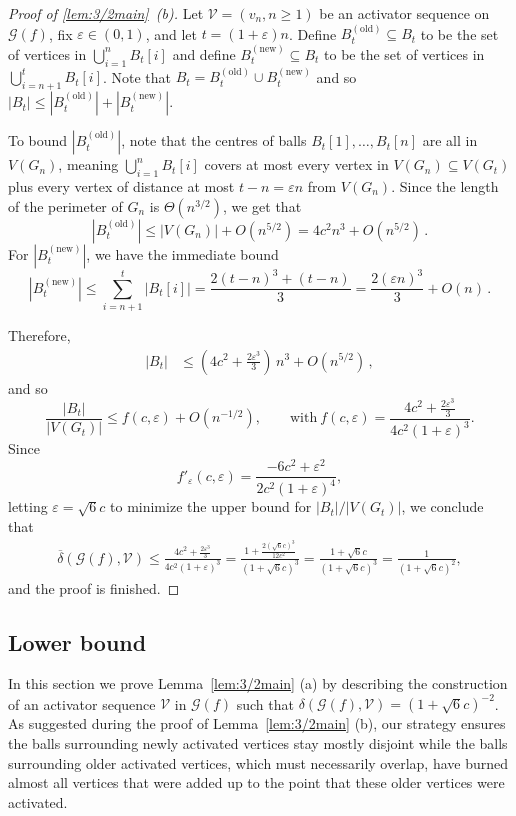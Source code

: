 \documentclass[12pt]{article}
\theoremstyle{remark}
\newcommand\cG{\mathcal G}
\newcommand\cV{\mathcal V}
\begin{document}
\begin{proof}[Proof of \cref{lem:3/2main}~(b)]
Let $\cV = (v_n, n \geq 1)$ be an activator sequence on $\cG(f)$, fix $\varepsilon \in (0,1)$, and let $t = (1+\varepsilon)n$. Define $B_t^{(\text{old})} \subseteq B_t$ to be the set of vertices in $\bigcup_{i=1}^n B_t[i]$ and define $B_t^{(\text{new})} \subseteq B_t$ to be the set of vertices in $\bigcup_{i=n+1}^t B_t[i]$. Note that $B_t = B_t^{(\text{old})} \cup B_t^{(\text{new})}$ and so $|B_t| \leq |B_t^{(\text{old})}| + |B_t^{(\text{new})}|$. 

To bound $|B_t^{(\text{old})}|$, note that the centres of balls $B_t[1],\dots,B_t[n]$ are all in $V(G_n)$, meaning $\bigcup_{i=1}^n B_t[i]$ covers at most every vertex in $V(G_n) \subseteq V(G_t)$ plus every vertex of distance at most $t-n = \varepsilon n$ from $V(G_n)$. Since the length of the perimeter of $G_n$ is $\Theta( n^{3/2})$, we get that
\[
|B_t^{(\text{old})}| \leq |V(G_n)| + O(n^{5/2}) = 4c^2n^3 + O(n^{5/2}) \,.
\]
For $|B_t^{(\text{new})}|$, we have the immediate bound
\[
|B_t^{(\text{new})}| 
\leq 
\sum_{i=n+1}^t |B_t[i]|
=
\frac{2(t-n)^3 + (t-n)}{3}
=
\frac{2(\varepsilon n)^3}{3} + O(n) \,.
\]

Therefore, 
\begin{align*}
|B_t|
&\leq
\left( 4c^2 + \frac{2 \varepsilon^3}{3}\right) \, n^3 + O(n^{5/2}) \,,
\end{align*}
and so 
$$
\frac {|B_t|}{|V(G_t)|} \le f(c,\varepsilon) + O(n^{-1/2}), \qquad \text{with} \ f(c,\varepsilon) = \frac{4c^2 + \frac{2 \varepsilon^3}{3}}{4c^2(1+\varepsilon)^3}. 
$$
Since
$$
f'_\varepsilon(c,\varepsilon) = \frac {-6c^2 + \varepsilon^2}{2c^2(1 + \varepsilon)^4},
$$
letting $\varepsilon = \sqrt{6}c$ to minimize the upper bound for $|B_t| / |V(G_t)|$, we conclude that 
\begin{align*}
\overline{\delta}(\cG(f),\cV) 
\leq
\frac{4c^2 + \frac{2 \varepsilon^3}{3}}{4c^2(1+\varepsilon)^3} 
=
\frac{1 + \frac{2 (\sqrt{6} c)^3}{12 c^2}}{(1+\sqrt{6} c)^3} 
=
\frac{1 + \sqrt{6} c}{(1+\sqrt{6} c)^3} 
=
\frac{1}{(1+\sqrt{6} c)^2}, 
\end{align*}
and the proof is finished.
\end{proof}

\subsection{Lower bound}\label{sec:lowerbound}

In this section we prove Lemma~\ref{lem:3/2main} (a) by describing the construction of an activator sequence $\cV$ in $\cG(f)$ such that $\delta(\cG(f),\cV) = (1+\sqrt{6}c)^{-2}$. As suggested during the proof of Lemma~\ref{lem:3/2main} (b), our strategy ensures the balls surrounding newly activated vertices stay mostly disjoint while the balls surrounding older activated vertices, which must necessarily overlap, have burned almost all vertices that were added up to the point that these older vertices were activated.
\end{document}
